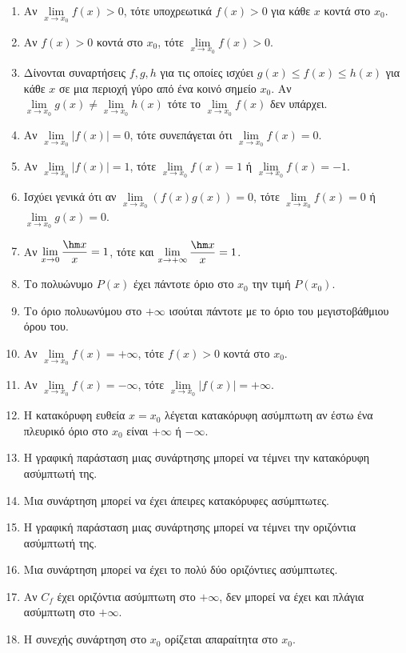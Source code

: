 \documentclass[11pt,a4paper]{article}
\begin{document}
\begin{enumerate}[label=\textbf{1.\arabic*.}]
    \item Αν $\lim\limits_{x\to x_0} f(x) > 0$, τότε υποχρεωτικά $f(x) > 0$ για κάθε $x$ κοντά στο $x_0$.
    \item Αν $f(x) > 0$ κοντά στο $x_0$, τότε $\lim\limits_{x\to x_0} f(x) > 0$.
    \item Δίνονται συναρτήσεις $f,g,h$ για τις οποίες ισχύει $g(x)\leq f(x)\leq h(x)$ για κάθε $x$ σε μια περιοχή γύρο από ένα κοινό σημείο $x_0$. Αν $\lim\limits_{x\to x_0}{g(x)}\neq\lim\limits_{x\to x_0}{h(x)}$ τότε το $\lim\limits_{x\to x_0}{f(x)}$ δεν υπάρχει.
    \item Αν $\lim\limits_{x\to x_0} |f(x)| = 0$, τότε συνεπάγεται ότι $\lim\limits_{x\to x_0} f(x) = 0$.
    \item Αν $\lim\limits_{x\to x_0} |f(x)| = 1$, τότε $\lim\limits_{x\to x_0} f(x) = 1$ ή $\lim\limits_{x\to x_0} f(x) = -1$.
    \item Ισχύει γενικά ότι αν $\lim\limits_{x\to x_0} (f(x)g(x)) = 0$, τότε $\lim\limits_{x\to x_0} f(x) = 0$ ή $\lim\limits_{x\to x_0} g(x) = 0$.
    \item Αν $\lim\limits_{x \to 0} \dfrac{\hm x}{x} = 1$, τότε και $\lim\limits_{x \to +\infty} \dfrac{\hm x}{x} = 1$.
    \item Το πολυώνυμο $P(x)$ έχει πάντοτε όριο στο $x_0$ την τιμή $P(x_0)$.
    \item Το όριο πολυωνύμου στο $+\infty$ ισούται πάντοτε με το όριο του μεγιστοβάθμιου όρου του.
    \item Αν $\lim\limits_{x\to x_0} f(x) = +\infty$, τότε $f(x) > 0$ κοντά στο $x_0$.
    \item Αν $\lim\limits_{x\to x_0} f(x) = -\infty$, τότε $\lim\limits_{x\to x_0} |f(x)| = +\infty$.
    \item Η κατακόρυφη ευθεία $x=x_0$ λέγεται κατακόρυφη ασύμπτωτη αν έστω ένα πλευρικό όριο στο $x_0$ είναι $+\infty$ ή $-\infty$.
    \item Η γραφική παράσταση μιας συνάρτησης μπορεί να τέμνει την κατακόρυφη ασύμπτωτή της.
    \item Μια συνάρτηση μπορεί να έχει άπειρες κατακόρυφες ασύμπτωτες.
    \item Η γραφική παράσταση μιας συνάρτησης μπορεί να τέμνει την οριζόντια ασύμπτωτή της.
    \item Μια συνάρτηση μπορεί να έχει το πολύ δύο οριζόντιες ασύμπτωτες.
    \item Αν $C_f$ έχει οριζόντια ασύμπτωτη στο $+\infty$, δεν μπορεί να έχει και πλάγια ασύμπτωτη στο $+\infty$.
    \item Η συνεχής συνάρτηση στο $x_0$ ορίζεται απαραίτητα στο $x_0$.

\end{enumerate}
\end{document}
